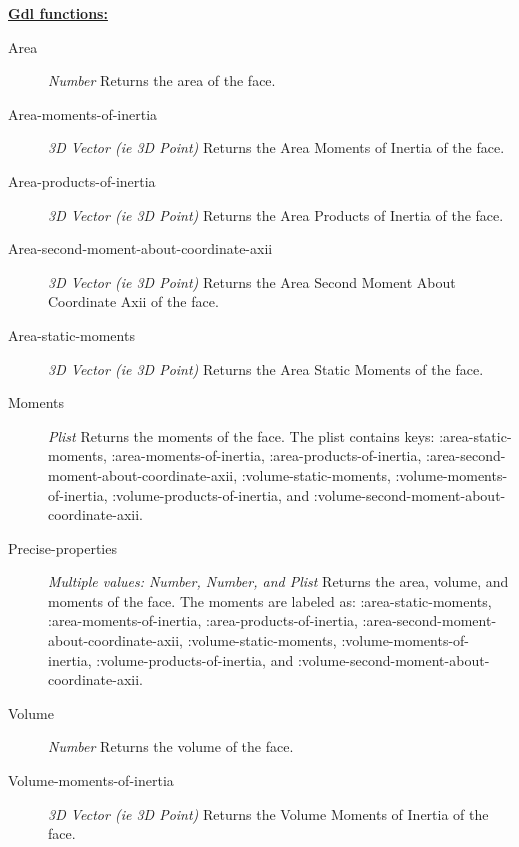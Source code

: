 \documentclass [11pt]{book}
\begin{document}
\begin{itemize}
\textbf{
\underline{Gdl functions:}}

\begin{description}

\item [Area]
\emph{Number} Returns the area of the face.


\item [Area-moments-of-inertia]
\emph{3D Vector (ie 3D Point)} Returns the Area Moments of Inertia of the face.


\item [Area-products-of-inertia]
\emph{3D Vector (ie 3D Point)} Returns the Area Products of Inertia of the face.


\item [Area-second-moment-about-coordinate-axii]
\emph{3D Vector (ie 3D Point)} Returns the Area Second Moment About Coordinate Axii of the face.


\item [Area-static-moments]
\emph{3D Vector (ie 3D Point)} Returns the Area Static Moments of the face.


\item [Moments]
\emph{Plist} Returns the moments of the face. The plist contains keys: :area-static-moments, :area-moments-of-inertia,  :area-products-of-inertia, :area-second-moment-about-coordinate-axii, :volume-static-moments,  :volume-moments-of-inertia, :volume-products-of-inertia, and  :volume-second-moment-about-coordinate-axii.


\item [Precise-properties]
\emph{Multiple values: Number, Number, and Plist} Returns the area, volume, and moments of the face.
The moments are labeled as: :area-static-moments, :area-moments-of-inertia, :area-products-of-inertia, :area-second-moment-about-coordinate-axii, :volume-static-moments, :volume-moments-of-inertia, :volume-products-of-inertia, and  :volume-second-moment-about-coordinate-axii.


\item [Volume]
\emph{Number} Returns the volume of the face.


\item [Volume-moments-of-inertia]
\emph{3D Vector (ie 3D Point)} Returns the Volume Moments of Inertia of the face.



\end{description}
\end{itemize}
\end{document}
